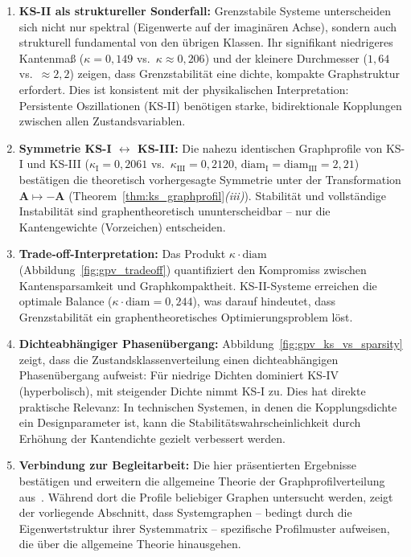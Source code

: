 \documentclass[a4paper, 12pt, twoside, openright]{report}
\theoremstyle{definition}
\theoremstyle{definition}
\newcommand{\vA}{\bm{A}}
\begin{document}
\begin{enumerate}[label=(\arabic*)]
  \item \textbf{KS-II als struktureller Sonderfall:} Grenzstabile Systeme unterscheiden
    sich nicht nur spektral (Eigenwerte auf der imaginären Achse), sondern auch strukturell
    fundamental von den übrigen Klassen. Ihr signifikant niedrigeres Kantenmaß
    ($\kappa = 0{,}149$ vs.\ $\kappa \approx 0{,}206$) und der kleinere Durchmesser
    ($1{,}64$ vs.\ $\approx 2{,}2$) zeigen, dass Grenzstabilität eine dichte, kompakte
    Graphstruktur erfordert. Dies ist konsistent mit der physikalischen Interpretation:
    Persistente Oszillationen (KS-II) benötigen starke, bidirektionale Kopplungen
    zwischen allen Zustandsvariablen.

  \item \textbf{Symmetrie KS-I $\leftrightarrow$ KS-III:} Die nahezu identischen
    Graphprofile von KS-I und KS-III ($\kappa_{\mathrm{I}} = 0{,}2061$ vs.\
    $\kappa_{\mathrm{III}} = 0{,}2120$, $\mathrm{diam}_{\mathrm{I}} =
    \mathrm{diam}_{\mathrm{III}} = 2{,}21$) bestätigen die theoretisch vorhergesagte
    Symmetrie unter der Transformation $\vA \mapsto -\vA$
    (Theorem~\ref{thm:ks_graphprofil}\textit{(iii)}). Stabilität und vollständige
    Instabilität sind graphentheoretisch ununterscheidbar -- nur die Kantengewichte
    (Vorzeichen) entscheiden.

  \item \textbf{Trade-off-Interpretation:} Das Produkt $\kappa \cdot \mathrm{diam}$
    (Abbildung~\ref{fig:gpv_tradeoff}) quantifiziert den Kompromiss zwischen
    Kantensparsamkeit und Graphkompaktheit. KS-II-Systeme erreichen die optimale
    Balance ($\kappa \cdot \mathrm{diam} = 0{,}244$), was darauf hindeutet, dass
    Grenzstabilität ein graphentheoretisches Optimierungsproblem löst.

  \item \textbf{Dichteabhängiger Phasenübergang:} Abbildung~\ref{fig:gpv_ks_vs_sparsity}
    zeigt, dass die Zustandsklassenverteilung einen dichteabhängigen Phasenübergang
    aufweist: Für niedrige Dichten dominiert KS-IV (hyperbolisch), mit steigender
    Dichte nimmt KS-I zu. Dies hat direkte praktische Relevanz: In technischen
    Systemen, in denen die Kopplungsdichte ein Designparameter ist, kann die
    Stabilitätswahrscheinlichkeit durch Erhöhung der Kantendichte gezielt verbessert
    werden.

  \item \textbf{Verbindung zur Begleitarbeit:} Die hier präsentierten Ergebnisse
    bestätigen und erweitern die allgemeine Theorie der Graphprofilverteilung
    aus~\citep{epp2026graphs}. Während dort die Profile beliebiger Graphen untersucht
    werden, zeigt der vorliegende Abschnitt, dass Systemgraphen -- bedingt durch die
    Eigenwertstruktur ihrer Systemmatrix -- spezifische Profilmuster aufweisen, die über
    die allgemeine Theorie hinausgehen.
\end{enumerate}
\end{document}
